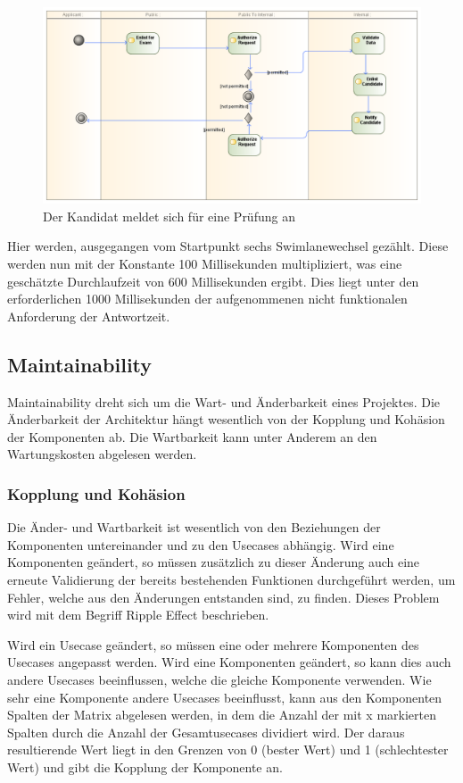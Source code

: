 \begin{figure}[H]
    \centering
    \includegraphics[scale=0.4]{uml/applycomplicated.png}
    \caption{Der Kandidat meldet sich für eine Prüfung an}
    \label{fig:applycomplicated}
\end{figure}

Hier werden, ausgegangen vom Startpunkt sechs Swimlanewechsel gezählt. Diese werden nun mit der Konstante 100 Millisekunden multipliziert, was eine geschätzte Durchlaufzeit von 600 Millisekunden ergibt. Dies liegt unter den erforderlichen 1000 Millisekunden der aufgenommenen nicht funktionalen Anforderung der Antwortzeit.

\subsection{Maintainability}
Maintainability dreht sich um die Wart- und Änderbarkeit eines Projektes. Die Änderbarkeit der Architektur hängt wesentlich von der Kopplung und Kohäsion der Komponenten ab. Die Wartbarkeit kann unter Anderem an den Wartungskosten abgelesen werden.

\subsubsection{Kopplung und Kohäsion}
Die Änder- und Wartbarkeit ist wesentlich von den Beziehungen der Komponenten untereinander und zu den Usecases abhängig. Wird eine Komponenten geändert, so müssen zusätzlich zu dieser Änderung auch eine erneute Validierung der bereits bestehenden Funktionen durchgeführt werden, um Fehler, welche aus den Änderungen entstanden sind, zu finden. Dieses Problem wird mit dem Begriff Ripple Effect beschrieben. \cite[S. 3]{ripple}

Wird ein Usecase geändert, so müssen eine oder mehrere Komponenten des Usecases angepasst werden. Wird eine Komponenten geändert, so kann dies auch andere Usecases beeinflussen, welche die gleiche Komponente verwenden. Wie sehr eine Komponente andere Usecases beeinflusst, kann aus den Komponenten Spalten der Matrix abgelesen werden, in dem die Anzahl der mit x markierten Spalten durch die Anzahl der Gesamtusecases dividiert wird. Der daraus resultierende Wert liegt in den Grenzen von 0 (bester Wert) und 1 (schlechtester Wert) und gibt die Kopplung der Komponente an. \cite[S. 164]{effektiv}

